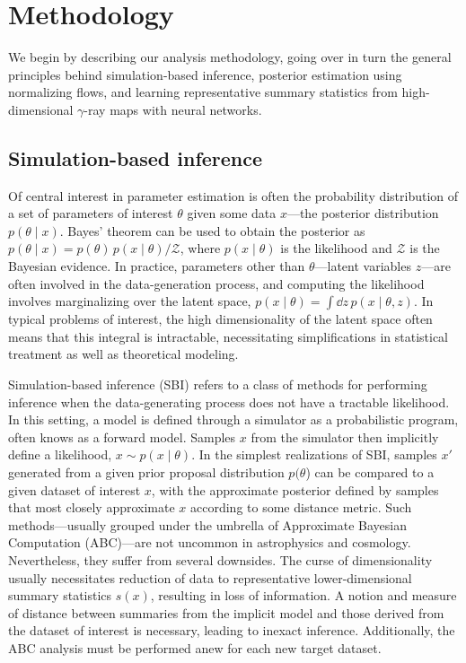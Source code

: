 \documentclass[prd,aps,10pt,nofootinbib,twocolumn,superscriptaddress,preprintnumbers,balancelastpage,longbibliography]{revtex4-1}
\begin{document}
\section{Methodology}
\label{sec:analysis}

We begin by describing our analysis methodology, going over in turn the general principles behind simulation-based inference, posterior estimation using normalizing flows, and learning representative summary statistics from high-dimensional $\gamma$-ray maps with neural networks.

\subsection{Simulation-based inference}

Of central interest in parameter estimation is often the probability distribution of a set of parameters of interest $\theta$ given some data $x$---the posterior distribution $p(\theta\mid x)$. Bayes' theorem can be used to obtain the posterior as $p(\theta\mid x) = p(\theta)\, p(x\mid\theta) / \mathcal Z$, where $p(x\mid\theta)$ is the likelihood and $\mathcal Z$ is the Bayesian evidence. In practice, parameters other than $\theta$---latent variables $z$---are often involved in the data-generation process, and computing the likelihood involves marginalizing over the latent space, $p(x\mid\theta) = \int \dd z\,p(x\mid\theta, z)$. In typical problems of interest, the high dimensionality of the latent space often means that this integral is intractable, necessitating simplifications in statistical treatment as well as theoretical modeling. 


Simulation-based inference (SBI) refers to a class of methods for performing inference when the data-generating process does not have a tractable likelihood. In this setting, a model is defined through a simulator as a probabilistic program, often knows as a forward model. Samples $x$ from the simulator then implicitly define a likelihood, $x\sim p(x\mid\theta)$. In the simplest realizations of SBI, samples $x'$ generated from a given prior proposal distribution $p(\theta$) can be compared to a given dataset of interest $x$, with the approximate posterior defined by samples that most closely approximate $x$ according to some distance metric. Such methods---usually grouped under the umbrella of Approximate Bayesian Computation (ABC)---are not uncommon in astrophysics and cosmology. Nevertheless, they suffer from several downsides. The curse of dimensionality usually necessitates reduction of data to representative lower-dimensional summary statistics $s(x)$, resulting in loss of information. A notion and measure of distance between summaries from the implicit model and those derived from the dataset of interest is necessary, leading to inexact inference. Additionally, the ABC analysis must be performed anew for each new target dataset.
\end{document}
